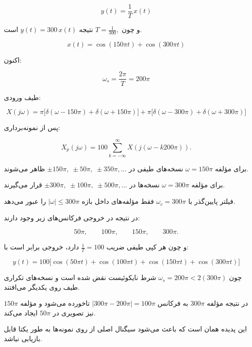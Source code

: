 \[
{
y(t)=\frac1T\,x(t)
}
\]

و چون
\(
T=\frac1{300},
\)
نتیجه
\(
y(t)=300\,x(t)
\)
است.


\[x(t)=\cos(150\pi t)+\cos(300\pi t)\]

اکنون:

\[
\omega_s
=
\frac{2\pi}{T}
=
200\pi
\]

طیف ورودی:

\[
X(j\omega)
=
\pi\Big[
\delta(\omega-150\pi)+\delta(\omega+150\pi)
\Big]
+
\pi\Big[
\delta(\omega-300\pi)+\delta(\omega+300\pi)
\Big]
\]

پس از نمونه‌برداری:

\[
X_p(j\omega)
=
100
\sum_{k=-\infty}^{\infty}
X\!\left(j(\omega-k200\pi)\right).
\]

برای مؤلفه
\(
\omega=150\pi
\)
نسخه‌های طیفی در
\(
\pm150\pi,\;
\pm50\pi,\;
\pm350\pi,\ldots
\)
ظاهر می‌شوند.

برای مؤلفه
\(
\omega=300\pi
\)
نسخه‌ها در
\(
\pm300\pi,\;
\pm100\pi,\;
\pm500\pi,\ldots
\)
قرار می‌گیرند.

فیلتر پایین‌گذر با
\(
\omega_c=300\pi
\)
فقط مؤلفه‌های داخل بازه
\(
|\omega|\le 300\pi
\)
را عبور می‌دهد.

در نتیجه در خروجی فرکانس‌های زیر وجود دارند:

\[
50\pi,\qquad
100\pi,\qquad
150\pi,\qquad
300\pi.
\]

و چون هر کپی طیفی ضریب
\(
\frac1T=100
\)
دارد، خروجی برابر است با:

\[
{
y(t)
=
100\Big[
\cos(50\pi t)
+
\cos(100\pi t)
+
\cos(150\pi t)
+
\cos(300\pi t)
\Big]
}
\]


چون
\(
\omega_s=200\pi
<
2(300\pi)
\)
شرط نایکوئیست نقض شده است و نسخه‌های تکراری طیف روی یکدیگر می‌افتند.

در نتیجه مؤلفه
\(
300\pi
\)
به فرکانس
\(
|300\pi-200\pi|
=
100\pi
\)
تاخورده می‌شود و مؤلفه
\(
150\pi
\)
نیز تصویری در
\(
50\pi
\)
ایجاد می‌کند.

این پدیده همان
{}
است که باعث می‌شود سیگنال اصلی از روی نمونه‌ها به طور یکتا قابل بازیابی نباشد.
